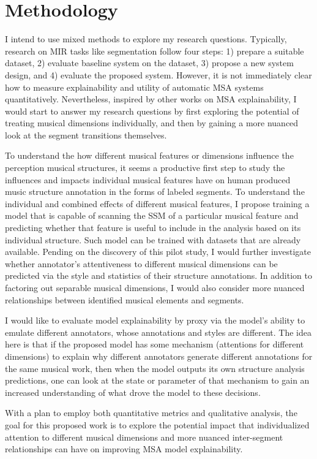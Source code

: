 \section{Methodology}
I intend to use mixed methods to explore my research questions.
Typically, research on MIR tasks like segmentation follow four steps: 1) prepare a suitable dataset, 2) evaluate baseline system on the dataset, 3) propose a new system design, and 4) evaluate the proposed system.
However, it is not immediately clear how to measure explainability and utility of automatic MSA systems quantitatively.
Nevertheless, inspired by other works on MSA explainability, I would start to answer my research questions by first exploring the potential of treating musical dimensions individually, and then by gaining a more nuanced look at the segment transitions themselves.

To understand the how different musical features or dimensions influence the perception musical structures, it seems a productive first step to study the influences and impacts individual musical features have on human produced music structure annotation in the forms of labeled segments.
To understand the individual and combined effects of different musical features, I propose training a model that is capable of scanning the SSM of a particular musical feature and predicting whether that feature is useful to include in the analysis based on its individual structure.
Such model can be trained with datasets that are already available.
Pending on the discovery of this pilot study, I would further investigate whether annotator's attentiveness to different musical dimensions can be predicted via the style and statistics of their structure annotations.
In addition to factoring out separable musical dimensions, I would also consider more nuanced relationships between identified musical elements and segments.

I would like to evaluate model explainability by proxy via the model's ability to emulate different annotators, whose annotations and styles are different.
The idea here is that if the proposed model has some mechanism (attentions for different dimensions) to explain why different annotators generate different annotations for the same musical work, then when the model outputs its own structure analysis predictions, one can look at the state or parameter of that mechanism to gain an increased understanding of what drove the model to these decisions.

With a plan to employ both quantitative metrics and qualitative analysis, the goal for this proposed work is to explore the potential impact that individualized attention to different musical dimensions and more nuanced inter-segment relationships can have on improving MSA model explainability.